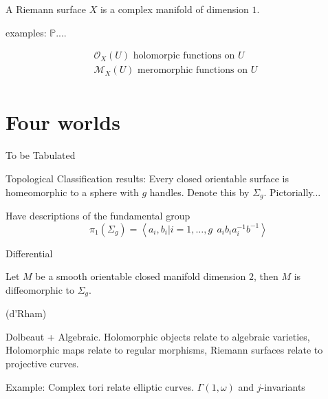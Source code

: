 % 

\title{}
\author{Marille Ong}
\date{}

 
\maketitle

\begin{definition}
  A Riemann surface $X$ is a complex manifold of dimension $1$.
\end{definition}

examples:
$ \mathbb{P} $.... 

\begin{align}
    \mathcal{O}_X ( U) \mbox{ holomorpic functions on $U$ } \\
    \mathcal{M}_X ( U) \mbox{ meromorphic functions on $U$ } \\
\end{align}

\section{Four worlds} %

To be Tabulated 

Topological 
Classification results: Every closed orientable surface is homeomorphic to a sphere with $g$ handles. 
Denote this by $\Sigma_g$. 
Pictorially...

Have descriptions of the fundamental group
\begin{equation}
    \pi_1 ( \Sigma_g) = \left< a_i, b_i | i =1, \dots, g ~~ a_i b_i a_i^{-1} b^{-1} \right> 
\end{equation}

Differential 
\begin{theorem}
Let $M $ be a smooth orientable closed manifold dimension $2$, 
then $M$ is diffeomorphic to $\Sigma _g $. 
\end{theorem}

\begin{theorem}
    (d'Rham) 
\end{theorem}

Dolbeaut + Algebraic.
Holomorphic objects relate to algebraic varieties, 
Holomorphic maps relate to regular morphisms, 
Riemann surfaces relate to projective curves. 

Example: Complex tori relate elliptic curves. 
$ \Gamma( 1, \omega) $  and $j$-invariants 

